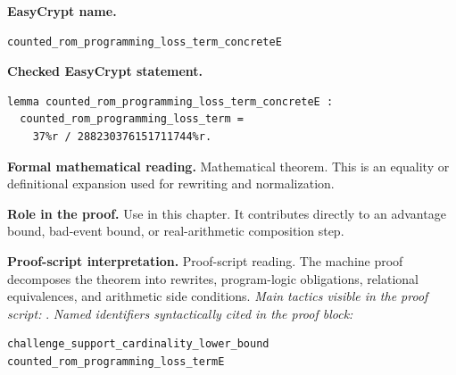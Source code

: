 \begin{formaltheorem}
\noindent\textbf{EasyCrypt name.}
\begin{lstlisting}[language=EasyCrypt,basicstyle=\ttfamily\scriptsize]
counted_rom_programming_loss_term_concreteE
\end{lstlisting}
\noindent\textbf{Checked EasyCrypt statement.}
\begin{lstlisting}[language=EasyCrypt,basicstyle=\ttfamily\scriptsize]
lemma counted_rom_programming_loss_term_concreteE :
  counted_rom_programming_loss_term =
    37%r / 288230376151711744%r.
\end{lstlisting}
\noindent\textbf{Formal mathematical reading.}
Mathematical theorem. This is an equality or definitional expansion used for rewriting and normalization.

\noindent\textbf{Role in the proof.}
Use in this chapter. It contributes directly to an advantage bound, bad-event bound, or real-arithmetic composition step.

\noindent\textbf{Proof-script interpretation.}
Proof-script reading. The machine proof decomposes the theorem into rewrites, program-logic obligations, relational equivalences, and arithmetic side conditions.
\emph{Main tactics visible in the proof script:} .
\emph{Named identifiers syntactically cited in the proof block:}
\begin{lstlisting}[language=EasyCrypt,basicstyle=\ttfamily\scriptsize]
challenge_support_cardinality_lower_bound
counted_rom_programming_loss_termE
\end{lstlisting}

\end{formaltheorem}

